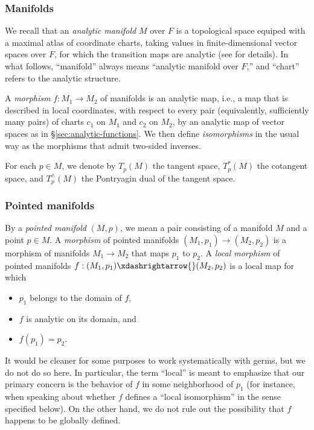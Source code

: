 \subsubsection{Manifolds}\label{sec:manifolds}
We recall that an \emph{analytic manifold} $M$ over $F$ is a topological space equiped with a maximal atlas of coordinate charts, taking values in finite-dimensional vector spaces over $F$, for which the  transition maps are analytic (see \cite[Part II, Chapter III]{MR2179691} for details).  In what follows, ``manifold'' always means ``analytic manifold over $F$,'' and ``chart'' refers to the analytic structure.

A \emph{morphism} $f : M_1 \rightarrow M_2$ of manifolds is an analytic map, i.e., a map that is described in local coordinates, with respect to every pair (equivalently, sufficiently many pairs) of charts $c_1$ on $M_1$ and $c_2$ on $M_2$, by an analytic map of vector spaces as in \S\ref{sec:analytic-functions}.  We then define \emph{isomorphisms} in the usual way as the morphisms that admit two-sided inverses.


For each $p \in M$, we denote by $T_p(M)$ the tangent space, $T_p^*(M)$ the cotangent space, and $T_p^\wedge(M)$ the Pontryagin dual of the tangent space.


\subsubsection{Pointed manifolds}\label{sec:pointed-manifolds}
By a \emph{pointed manifold} $(M,p)$, we mean a pair consisting of a manifold $M$ and a point $p \in M$.  A \emph{morphism} of pointed manifolds $(M_1, p_1) \rightarrow (M_2, p_2)$ is a morphism of manifolds $M_1 \rightarrow M_2$ that maps $p_1$ to $p_2$.  A \emph{local morphism} of pointed manifolds $f : (M_1,p_1) \xdashrightarrow{} (M_2,p_2)$ is a local map for which
\begin{itemize}
\item $p_1$ belongs to the domain of $f$,
\item $f$ is analytic on its domain, and
\item $f(p_1) = p_2$.
\end{itemize}
It would be cleaner for some purposes to work systematically with germs, but we do not do so here.  In particular, the term ``local'' is meant to emphasize that our primary concern is the behavior of $f$ in some neighborhood of $p_1$ (for instance, when speaking about whether $f$ defines a ``local isomorphism'' in the sense specified below).  On the other hand, we do not rule out the possibility that $f$ happens to be globally defined.

